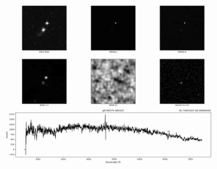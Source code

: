 \begin{figure}[H]
\begin{center}
        \includegraphics[scale = 0.10]{figuras/6.jpg}
        \label{fig:my_label}
    \end{center}
\end{figure}

